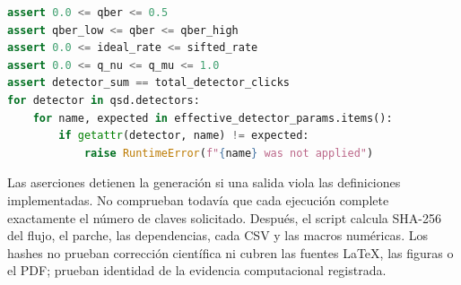 \begin{lstlisting}[language=Python, caption={Ejemplos de invariantes verificados antes de exportar.}]
assert 0.0 <= qber <= 0.5
assert qber_low <= qber <= qber_high
assert 0.0 <= ideal_rate <= sifted_rate
assert 0.0 <= q_nu <= q_mu <= 1.0
assert detector_sum == total_detector_clicks
for detector in qsd.detectors:
    for name, expected in effective_detector_params.items():
        if getattr(detector, name) != expected:
            raise RuntimeError(f"{name} was not applied")
\end{lstlisting}

Las aserciones detienen la generación si una salida viola las definiciones implementadas. No comprueban todavía que cada ejecución complete exactamente el número de claves solicitado. Después, el script calcula SHA-256 del flujo, el parche, las dependencias, cada CSV y las macros numéricas. Los hashes no prueban corrección científica ni cubren las fuentes LaTeX, las figuras o el PDF; prueban identidad de la evidencia computacional registrada.
